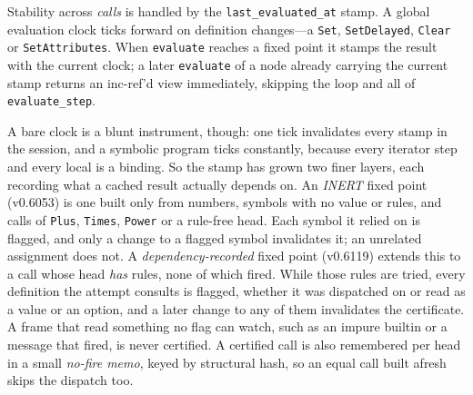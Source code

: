 Stability across \emph{calls} is handled by the \texttt{last\_evaluated\_at} stamp. A
global evaluation clock ticks forward on definition changes---a \texttt{Set},
\texttt{SetDelayed}, \texttt{Clear} or \texttt{SetAttributes}. When
\texttt{evaluate} reaches a fixed point it stamps the result with the current clock;
a later \texttt{evaluate} of a node already carrying the current stamp returns an
inc-ref'd view immediately, skipping the loop and all of \texttt{evaluate\_step}.

A bare clock is a blunt instrument, though: one tick invalidates every stamp in the
session, and a symbolic program ticks constantly, because every iterator step and
every  local is a binding. So the stamp has grown two finer layers, each
recording what a cached result actually depends on.
An \emph{INERT} fixed point (v0.6053) is one built only from numbers, symbols with no
value or rules, and calls of \texttt{Plus}, \texttt{Times}, \texttt{Power} or a
rule-free head. Each symbol it relied on is flagged, and only a change to a flagged
symbol invalidates it; an unrelated assignment does not. A \emph{dependency-recorded}
fixed point (v0.6119) extends this to a call whose head \emph{has} rules, none of
which fired. While those rules are tried, every definition the attempt consults is
flagged, whether it was dispatched on or read as a value or an option, and a later
change to any of them invalidates the certificate. A frame that read something no
flag can watch, such as an impure builtin or a message that fired, is never
certified. A certified call is also remembered per head in a small \emph{no-fire
memo}, keyed by structural hash, so an equal call built afresh skips the dispatch
too.

\begin{codepairs}
\end{codepairs}

